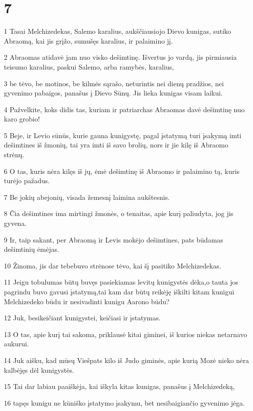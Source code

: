 \chapter{7}


\par 1 Tasai Melchizedekas, Salemo karalius, aukščiausiojo Dievo kunigas, sutiko Abraomą, kai jis grįžo, sumušęs karalius, ir palaimino jį. 
\par 2 Abraomas atidavė jam nuo visko dešimtinę. Išvertus jo vardą, jis pirmiausia teisumo karalius, paskui Salemo, arba ramybės, karalius,­ 
\par 3 be tėvo, be motinos, be kilmės sąrašo, neturintis nei dienų pradžios, nei gyvenimo pabaigos, panašus į Dievo Sūnų. Jis lieka kunigas visam laikui. 
\par 4 Pažvelkite, koks didis tas, kuriam ir patriarchas Abraomas davė dešimtinę nuo karo grobio! 
\par 5 Beje, ir Levio sūnūs, kurie gauna kunigystę, pagal įstatymą turi įsakymą imti dešimtines iš žmonių, tai yra imti iš savo brolių, nors ir jie kilę iš Abraomo strėnų. 
\par 6 O tas, kuris nėra kilęs iš jų, ėmė dešimtinę iš Abraomo ir palaimino tą, kuris turėjo pažadus. 
\par 7 Be jokių abejonių, visada žemesnį laimina aukštesnis. 
\par 8 Čia dešimtines ima mirtingi žmonės, o tenai­tas, apie kurį paliudyta, jog jis gyvena. 
\par 9 Ir, taip sakant, per Abraomą ir Levis mokėjo dešimtines, pats būdamas dešimtinių ėmėjas. 
\par 10 Žinoma, jis dar tebebuvo strėnose tėvo, kai šį pasitiko Melchizedekas. 
\par 11 Jeigu tobulumas būtų buvęs pasiekiamas levitų kunigystės dėka,­o tauta jos pagrindu buvo gavusi įstatymą,­tai kam dar būtų reikėję iškilti kitam kunigui Melchizedeko būdu ir nesivadinti kunigu Aarono būdu? 
\par 12 Juk, besikeičiant kunigystei, keičiasi ir įstatymas. 
\par 13 O tas, apie kurį tai sakoma, priklausė kitai giminei, iš kurios niekas netarnavo aukurui. 
\par 14 Juk aišku, kad mūsų Viešpats kilo iš Judo giminės, apie kurią Mozė nieko nėra kalbėjęs dėl kunigystės. 
\par 15 Tai dar labiau paaiškėja, kai iškyla kitas kunigas, panašus į Melchizedeką, 
\par 16 tapęs kunigu ne kūniško įstatymo įsakymu, bet nesibaigiančio gyvenimo jėga. 
